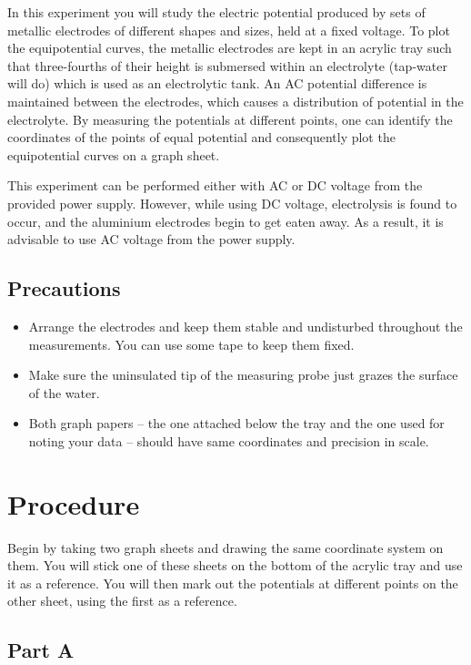 In this experiment you will study the electric potential produced by sets of metallic electrodes of different shapes and sizes, held at a fixed voltage. To plot the equipotential curves, the metallic electrodes are kept in an acrylic tray such that three-fourths of their height is submersed within an electrolyte (tap-water will do) which is used as an electrolytic tank. An AC potential difference is maintained between the electrodes, which causes a distribution of potential in the electrolyte. By measuring the potentials at different points, one can identify the coordinates of the points of equal potential and consequently plot the equipotential curves on a graph sheet. 

\begin{tip}
This experiment can be performed either with AC or DC voltage from the provided power supply. However, while using DC voltage, electrolysis is found to occur, and the aluminium electrodes begin to get eaten away. As a result, it is advisable to use AC voltage from the power supply.
\end{tip}

\subsection*{Precautions}

\begin{itemize}
\item Arrange the electrodes and keep them stable and undisturbed throughout the measurements. You can use some tape to keep them fixed.
\item Make sure the uninsulated tip of the measuring probe just grazes the surface of the water.
\item Both graph papers -- the one attached below the tray and the one used for noting your data -- should have same coordinates and precision in scale.
\end{itemize}


\section*{Procedure}

Begin by taking two graph sheets and drawing the same coordinate system on them. You will stick one of these sheets on the bottom of the acrylic tray and use it as a reference. You will then mark out the potentials at different points on the other sheet, using the first as a reference.

\subsection*{Part A} 

